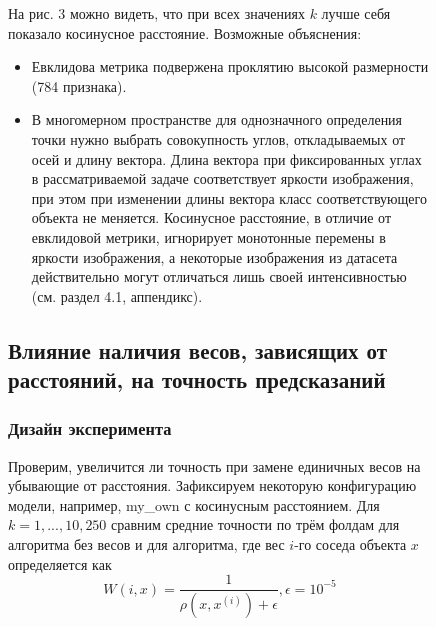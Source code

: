 \documentclass{article}
\begin{document}
\begin{figure}[H]
                На рис. 3 можно видеть, что при всех значениях $k$ лучше себя показало косинусное расстояние. Возможные объяснения:
                \begin{itemize}
                    \item Евклидова метрика подвержена проклятию высокой размерности (784 признака).
                    \item В многомерном пространстве для однозначного определения точки
                    нужно выбрать совокупность углов, откладываемых от осей и длину вектора.
                    Длина вектора при фиксированных углах в рассматриваемой задаче соответствует яркости изображения,
                    при этом при изменении длины вектора класс соответствующего объекта не меняется.
                    Косинусное расстояние, в отличие от евклидовой метрики, игнорирует монотонные перемены
                    в яркости изображения, а некоторые изображения из датасета действительно могут отличаться
                    лишь своей интенсивностью (см. раздел 4.1, аппендикс).
                \end{itemize}
    \subsection{Влияние наличия весов, зависящих от расстояний, на точность предсказаний}
        \subsubsection{Дизайн эксперимента}
                Проверим, увеличится ли точность при замене единичных весов на убывающие от расстояния.
                Зафиксируем некоторую конфигурацию модели, например, my\_own с косинусным расстоянием.
                Для $k = 1, ..., 10, 250$ сравним средние точности по трём фолдам для алгоритма без весов и для алгоритма, где вес $i$-го соседа объекта $x$ определяется как
                $$W(i, x) = \frac{1}{\rho(x, x^{(i)}) + \epsilon}, \epsilon = 10^{-5}$$

\end{figure}
\end{document}
